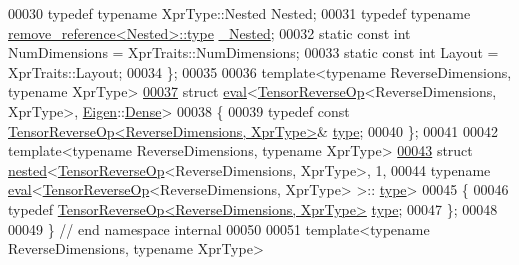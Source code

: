 \begin{DoxyCode}
00030   \textcolor{keyword}{typedef} \textcolor{keyword}{typename} XprType::Nested Nested;
00031   \textcolor{keyword}{typedef} \textcolor{keyword}{typename} \hyperlink{group___sparse_core___module}{remove\_reference<Nested>::type} 
      \hyperlink{group___sparse_core___module}{\_Nested};
00032   \textcolor{keyword}{static} \textcolor{keyword}{const} \textcolor{keywordtype}{int} NumDimensions = XprTraits::NumDimensions;
00033   \textcolor{keyword}{static} \textcolor{keyword}{const} \textcolor{keywordtype}{int} Layout = XprTraits::Layout;
00034 \};
00035 
00036 \textcolor{keyword}{template}<\textcolor{keyword}{typename} ReverseDimensions, \textcolor{keyword}{typename} XprType>
\hyperlink{struct_eigen_1_1internal_1_1eval_3_01_tensor_reverse_op_3_01_reverse_dimensions_00_01_xpr_type_01_4_00_01_eigen_1_1_dense_01_4}{00037} \textcolor{keyword}{struct }\hyperlink{struct_eigen_1_1internal_1_1eval}{eval}<\hyperlink{class_eigen_1_1_tensor_reverse_op}{TensorReverseOp}<ReverseDimensions, XprType>, 
      \hyperlink{namespace_eigen}{Eigen}::\hyperlink{struct_eigen_1_1_dense}{Dense}>
00038 \{
00039   \textcolor{keyword}{typedef} \textcolor{keyword}{const} \hyperlink{class_eigen_1_1_tensor_reverse_op}{TensorReverseOp<ReverseDimensions, XprType>}& 
      \hyperlink{class_eigen_1_1_tensor_reverse_op}{type};
00040 \};
00041 
00042 \textcolor{keyword}{template}<\textcolor{keyword}{typename} ReverseDimensions, \textcolor{keyword}{typename} XprType>
\hyperlink{struct_eigen_1_1internal_1_1nested_3_01_tensor_reverse_op_3_01_reverse_dimensions_00_01_xpr_type056f008193b03fc2e20fd2a6d2e9a44a}{00043} \textcolor{keyword}{struct }\hyperlink{struct_eigen_1_1internal_1_1nested}{nested}<\hyperlink{class_eigen_1_1_tensor_reverse_op}{TensorReverseOp}<ReverseDimensions, XprType>, 1,
00044             typename \hyperlink{struct_eigen_1_1internal_1_1eval}{eval}<\hyperlink{class_eigen_1_1_tensor_reverse_op}{TensorReverseOp}<ReverseDimensions, XprType> >::
      \hyperlink{class_eigen_1_1_tensor_reverse_op}{type}>
00045 \{
00046   \textcolor{keyword}{typedef} \hyperlink{class_eigen_1_1_tensor_reverse_op}{TensorReverseOp<ReverseDimensions, XprType>} 
      \hyperlink{class_eigen_1_1_tensor_reverse_op}{type};
00047 \};
00048 
00049 \}  \textcolor{comment}{// end namespace internal}
00050 
00051 \textcolor{keyword}{template}<\textcolor{keyword}{typename} ReverseDimensions, \textcolor{keyword}{typename} XprType>

\end{DoxyCode}
